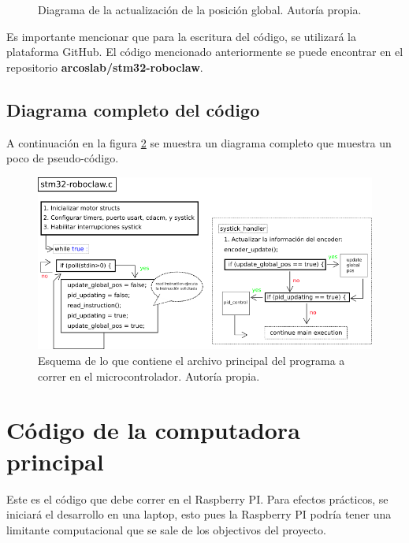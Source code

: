 \begin{figure}[H]
\centering

\caption{Diagrama de la actualización de la posición global. Autoría propia.}
\label{F:calculo_odometria}
\end{figure}

Es importante mencionar que para la escritura del código, se utilizará la plataforma GitHub. El código mencionado anteriormente se puede encontrar en el repositorio \textbf{arcoslab/stm32-roboclaw}.

\subsection{Diagrama completo del código}
A continuación en la figura \ref{F:main} se muestra un diagrama completo que muestra un poco de pseudo-código.

\begin{figure}[H]
\centering
%
%
\includegraphics[scale=0.8]{imagenes/diagrama_main.png}
\caption{Esquema de lo que contiene el archivo principal del programa a correr en el microcontrolador. Autoría propia.}
\label{F:main}
\end{figure}

\newpage

\section{Código de la computadora principal}

Este es el código que debe correr en el Raspberry PI. Para efectos prácticos, se iniciará el desarrollo en una laptop, esto pues la Raspberry PI podría tener una limitante computacional que se sale de los objectivos del proyecto.

